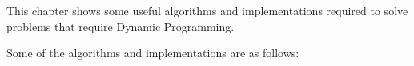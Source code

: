 This chapter shows some useful algorithms and implementations required to solve problems that require Dynamic Programming.

Some of the algorithms and implementations are as follows:
















